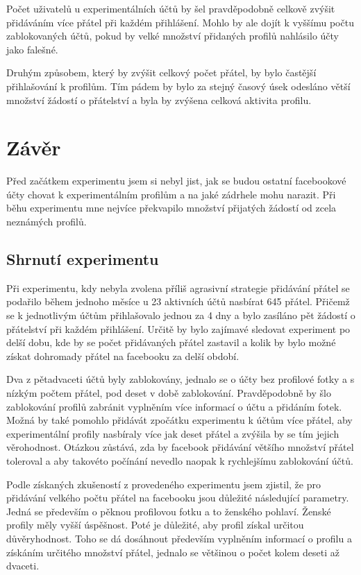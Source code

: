 \documentclass[thesis=M,czech]{FITthesis}[2013/05/10]
\begin{document}
Počet uživatelů u experimentálních účtů by šel pravděpodobně celkově zvýšit přidáváním více přátel při každém přihlášení. Mohlo by ale dojít k vyššímu počtu zablokovaných účtů, pokud by velké množství přidaných profilů nahlásilo účty jako  falešné.

Druhým způsobem, který by zvýšit celkový počet přátel, by bylo častější přihlašování k profilům. Tím pádem by bylo za stejný časový úsek odesláno větší množství žádostí o přátelství a byla by zvýšena celková aktivita profilu.


\chapter{Z{\' a}v{\v e}r}

Před začátkem experimentu jsem si nebyl jist, jak se budou ostatní facebookové účty chovat k experimentálním profilům a na jaké zádrhele mohu narazit. Při běhu experimentu mne nejvíce překvapilo množství přijatých žádostí od zcela neznámých profilů.

\section{Shrnutí experimentu}

Při experimentu, kdy nebyla zvolena příliš agrasivní strategie přidávání přátel se podařilo během jednoho měsíce u 23 aktivních účtů nasbírat 645 přátel. Přičemž se k jednotlivým účtům přihlašovalo jednou za 4 dny a bylo zasíláno pět žádostí o přátelství při každém přihlášení. Určitě by bylo zajímavé sledovat experiment po delší dobu, kde by se počet přidávaných přátel zastavil a kolik by bylo možné získat dohromady přátel na facebooku za delší období.

Dva z pětadvaceti účtů byly zablokovány, jednalo se o účty bez profilové fotky a s nízkým počtem přátel, pod deset v době zablokování. Pravděpodobně by šlo zablokování profilů zabránit vyplněním více informací o účtu a přidáním fotek. Možná by také pomohlo přidávát zpočátku experimentu k účtům více přátel, aby experimentální profily nasbíraly více jak deset přátel a zvýšila by se tím jejich věrohodnost. Otázkou zůstává, zda by facebook přidávání většího množství přátel toleroval a aby takovéto počínání nevedlo naopak k rychlejšímu zablokování účtů.

Podle získaných zkušeností z provedeného experimentu jsem zjistil, že pro přidávání velkého počtu přátel na facebooku jsou důležité následující parametry. Jedná se především o pěknou profilovou fotku a to ženského pohlaví. Ženské profily měly vyšší úspěšnost. Poté je důležité, aby profil získal určitou důvěryhodnost. Toho se dá dosáhnout především vyplněním informací o profilu a získáním určitého množství přátel, jednalo se většinou o počet kolem deseti až dvaceti.
\end{document}
